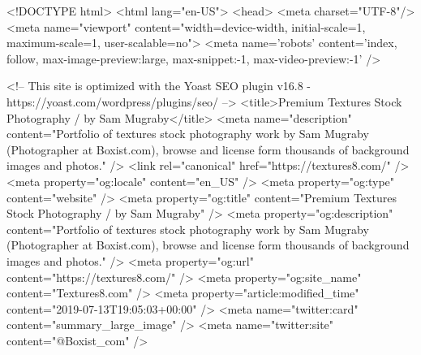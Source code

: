 <!DOCTYPE html>
<html lang="en-US">
<head>
	<meta charset="UTF-8"/>
	<meta name="viewport" content="width=device-width, initial-scale=1, maximum-scale=1, user-scalable=no">
	<meta name='robots' content='index, follow, max-image-preview:large, max-snippet:-1, max-video-preview:-1' />

	<!-- This site is optimized with the Yoast SEO plugin v16.8 - https://yoast.com/wordpress/plugins/seo/ -->
	<title>Premium Textures Stock Photography / by Sam Mugraby</title>
	<meta name="description" content="Portfolio of textures stock photography work by Sam Mugraby (Photographer at Boxist.com), browse and license form thousands of background images and photos." />
	<link rel="canonical" href="https://textures8.com/" />
	<meta property="og:locale" content="en_US" />
	<meta property="og:type" content="website" />
	<meta property="og:title" content="Premium Textures Stock Photography / by Sam Mugraby" />
	<meta property="og:description" content="Portfolio of textures stock photography work by Sam Mugraby (Photographer at Boxist.com), browse and license form thousands of background images and photos." />
	<meta property="og:url" content="https://textures8.com/" />
	<meta property="og:site_name" content="Textures8.com" />
	<meta property="article:modified_time" content="2019-07-13T19:05:03+00:00" />
	<meta name="twitter:card" content="summary_large_image" />
	<meta name="twitter:site" content="@Boxist_com" />
